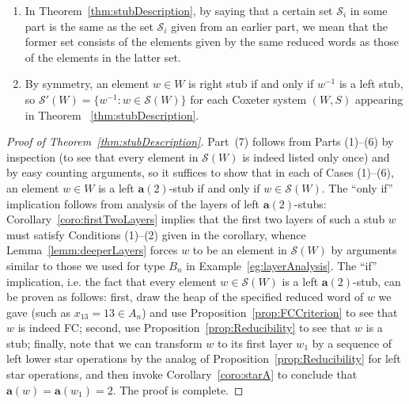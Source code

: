 \documentclass[ALCO,Unicode,published]{cedram}
\newcommand{\cals}{\mathcal{S}}
\newcommand{\la}{\mathbf{a}}
\newcommand{\sx}{\mathcal{S}(W)}
\newcommand{\sw}{\mathcal{S}(W)}
\newcommand{\twostub}{$\la(2)$-stub }
\newcommand{\inverse}{^{-1}}
\begin{document}
\begin{remark}
    \label{rmk:stubRemarks1}
    \begin{enumerate}
        \item In Theorem~\ref{thm:stubDescription}, by saying that a certain set $\cals_i$ in some part  is the same as
             the set $\cals_i$ given from an earlier part, we mean that the former set consists of the elements
             given by the same reduced words as those of the elements in the latter set. 
        \item By symmetry, an element $w\in W$ is right stub if and only if $w\inverse$ is a left stub, so
             $\cals'(W)=\{w\inverse: w\in \cals(W)\}$ for each Coxeter system $(W,S)$ appearing in Theorem
            ~\ref{thm:stubDescription}.
    \end{enumerate} 
\end{remark}


\begin{proof}[Proof of Theorem~\ref{thm:stubDescription}]
    Part~(7) follows from Parts (1)--(6) by inspection (to see that every element in $\sw$ is indeed
    listed only once) and by easy counting arguments, so it suffices to show that in each of Cases
    (1)--(6), an element $w\in W$ is a left \twostub if and only if $w\in \sx$. The ``only if''
    implication follows from analysis of the layers of left $\la(2)$-stubs:
    Corollary~\ref{coro:firstTwoLayers} implies that the first two layers of such a stub $w$ must satisfy
    Conditions (1)--(2) given in the corollary, whence Lemma~\ref{lemm:deeperLayers} forces $w$ to be an
    element in $\sw$ by arguments similar to those we used for type $B_n$ in
    Example~\ref{eg:layerAnalysis}. The ``if'' implication, i.e. the fact that every element $w\in \sw$ is
    a left $\la(2)$-stub, can be proven as follows: first, draw the heap of the specified reduced
    word of $w$ we gave (such as $x_{13}=13\in A_n$) and use Proposition~\ref{prop:FCCriterion} to see that $w$
    is indeed FC; second, use Proposition~\ref{prop:Reducibility} to see that $w$ is a stub;
    finally, note that we can transform $w$ to its first layer $w_1$ by a sequence of left lower
    star operations by the analog of Proposition~\ref{prop:Reducibility} for left star operations,
    and then invoke Corollary~\ref{coro:starA} to conclude that $\la(w)=\la(w_1)=2$.  The proof is complete.
\end{proof}
\end{document}
